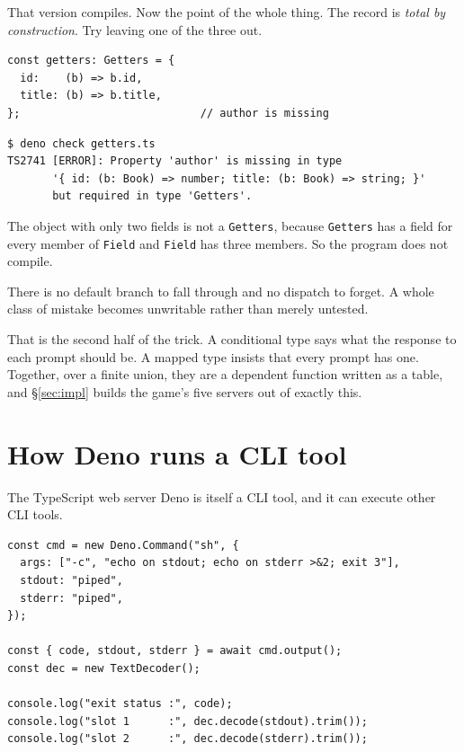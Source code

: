 \documentclass[11pt,a4paper]{article}
\begin{document}
\begin{pinkbox}
That version compiles. Now the point of the whole thing. The record is \emph{total by
construction}. Try leaving one of the three out.

\begin{lstlisting}[language=TS]
const getters: Getters = {
  id:    (b) => b.id,
  title: (b) => b.title,
};                            // author is missing
\end{lstlisting}

\begin{lstlisting}[language=SH]
$ deno check getters.ts
TS2741 [ERROR]: Property 'author' is missing in type
       '{ id: (b: Book) => number; title: (b: Book) => string; }'
       but required in type 'Getters'.
\end{lstlisting}

The object with only two fields is not a \texttt{Getters}, because \texttt{Getters} has a field for
every member of \texttt{Field} and \texttt{Field} has three members. So the program does not
compile.

There is no default branch to fall through and no dispatch to forget. A whole class of mistake
becomes unwritable rather than merely untested.

That is the second half of the trick. A conditional type says what the response to each prompt should
be. A mapped type insists that every prompt has one. Together, over a finite union, they are a
dependent function written as a table, and §\ref{sec:impl} builds the game's five servers out of
exactly this.
\end{pinkbox}

\newpage

\section{How Deno runs a CLI tool}
\label{sec:denocmd}

The TypeScript web server Deno is itself a CLI tool, and it can execute other CLI tools.

\begin{lstlisting}[language=TS]
const cmd = new Deno.Command("sh", {
  args: ["-c", "echo on stdout; echo on stderr >&2; exit 3"],
  stdout: "piped",
  stderr: "piped",
});

const { code, stdout, stderr } = await cmd.output();
const dec = new TextDecoder();

console.log("exit status :", code);
console.log("slot 1      :", dec.decode(stdout).trim());
console.log("slot 2      :", dec.decode(stderr).trim());
\end{lstlisting}
\end{document}
